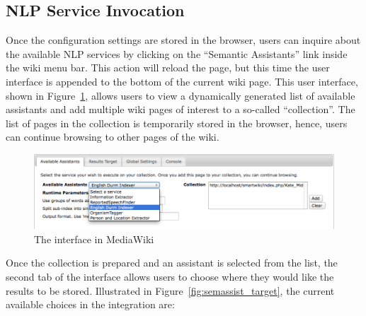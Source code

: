 \subsection{NLP Service Invocation}
Once the configuration settings are stored in the browser, users can inquire about the available NLP services by clicking on the ``Semantic Assistants'' link inside the wiki menu bar. This action will reload the page, but this time the \wikinlp user interface is appended to the bottom of the current wiki page. This user interface, shown in Figure~\ref{fig:semassist_ui}, allows users to view a dynamically generated list of available assistants and add multiple wiki pages of interest to a so-called ``collection''. The list of pages in the collection is temporarily stored in the browser, hence, users can continue browsing to other pages of the wiki.

\begin{figure}
\centering
\includegraphics[width=\textwidth]{pictures/semassist_ui.png}
\caption{The \wikinlp interface in MediaWiki}
\label{fig:semassist_ui}
\end{figure}

\blankline
Once the collection is prepared and an assistant is selected from the list, the second tab of the \wikinlp interface allows users to choose where they would like the results to be stored. Illustrated in Figure~\ref{fig:semassist_target}, the current available choices in the \wikinlp integration are:

